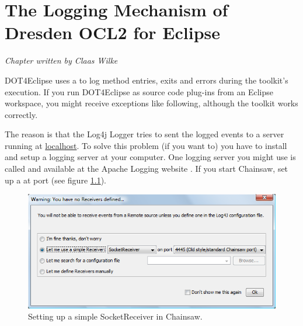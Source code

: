 \chapter{The Logging Mechanism of Dresden OCL2 for Eclipse}
\label{chapter:logging}

\begin{flushright}
\textit{Chapter written by Claas Wilke}
\end{flushright}

\acl{DOT4Eclipse} uses a  to log method entries, exits and errors during the toolkit's execution. If you run \acl{DOT4Eclipse} as source code plug-ins from an Eclipse workspace, you might receive exceptions like following, although the toolkit works correctly. 

\begin{center}
\end{center}

The reason is that the Log4j Logger tries to sent the logged events to a server running at \url{localhost}. To solve this problem (if you want to) you have to install and setup a logging server at your computer. One logging server you might use is called  and available at the Apache Logging website \cite{WWW:chainsaw}. If you start Chainsaw, set up a  at port  (see figure \ref{pic:logging:chainsaw01}).

\begin{figure}[!htbp]
	\centering
	\includegraphics[width=0.8\linewidth]{figures/logging/chainsaw01}
	\caption{Setting up a simple SocketReceiver in Chainsaw.}
	\label{pic:logging:chainsaw01}
\end{figure}